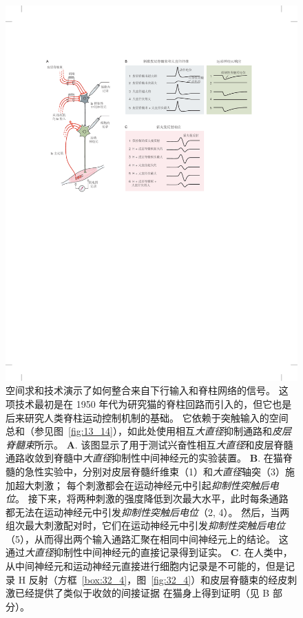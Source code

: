\begin{figure}[htbp]
	\centering
	\includegraphics[width=1.0\linewidth]{chap32/fig_32_9}
	\caption{空间求和技术演示了如何整合来自下行输入和脊柱网络的信号。
	这项技术最初是在 1950 年代为研究猫的脊柱回路而引入的，但它也是后来研究人类脊柱运动控制机制的基础。
	它依赖于突触输入的空间总和（参见图~\ref{fig:13_14}），如此处使用相互\textit{大直径}抑制通路和\textit{皮层脊髓束}所示。
	\textbf{A}. 该图显示了用于测试兴奋性相互\textit{大直径}和皮层脊髓通路收敛到脊髓中\textit{大直径}抑制性中间神经元的实验装置。
	\textbf{B}. 在猫脊髓的急性实验中，分别对皮层脊髓纤维束（1）和\textit{大直径}轴突（3）施加超大刺激；
	每个刺激都会在运动神经元中引起\textit{抑制性突触后电位}。
	接下来，将两种刺激的强度降低到次最大水平，此时每条通路都无法在运动神经元中引发\textit{抑制性突触后电位}（2, 4）。
	然后，当两组次最大刺激配对时，它们在运动神经元中引发\textit{抑制性突触后电位}（5），从而得出两个输入通路汇聚在相同中间神经元上的结论。
	这通过\textit{大直径}抑制性中间神经元的直接记录得到证实。
	\textbf{C}. 在人类中，从中间神经元和运动神经元直接进行细胞内记录是不可能的，但是记录 H 反射（方框~\ref{box:32_4}，图~\ref{fig:32_4}）和皮层脊髓束的经皮刺激已经提供了类似于收敛的间接证据 在猫身上得到证明（见 B 部分）。
}
\end{figure}
